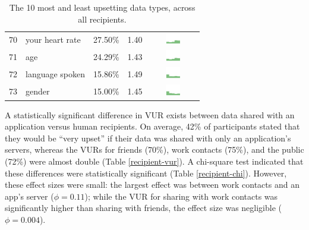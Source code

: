 \documentclass{sig-alternate-hotpets15}
\begin{document}
\begin{table}[t]
\begin{center}
\begin{tabular}{| r | l | r | r |c |}
70 & your heart rate & 27.50\% & 1.40 & \includegraphics[width = 2cm, height = 0.5cm]{tex-inputs/data10/learnedyourheartratecombined} \\
71 & age & 24.29\% & 1.43 & \includegraphics[width = 2cm, height = 0.5cm]{tex-inputs/data10/learnedyouragecombined}\\
72 & language spoken & 15.86\% & 1.49 & \includegraphics[width = 2cm, height = 0.5cm]{tex-inputs/data10/learnedthelanguageyouwerespeakingcombined}\\
73 & gender & 15.00\% & 1.45 & \includegraphics[width = 2cm, height = 0.5cm]{tex-inputs/data10/learnedyourgendercombined}\\ 
\hline
\end{tabular}
\caption{The 10 most and least upsetting data types, across all recipients.}
\label{top10-table}
\end{center}
\end{table}


A statistically significant difference in VUR exists between data shared with an application versus human recipients. On average, 42\% of participants stated that they would be ``very upset'' if their data was shared with only an application's servers, whereas the VURs for friends (70\%), work contacts (75\%), and the public (72\%) were almost double (Table \ref{recipient-vur}). A chi-square test indicated that these differences were statistically significant (Table \ref{recipient-chi}). However, these effect sizes were small: the largest effect was between work contacts and an app's server ($\phi=0.11$); while the VUR for sharing with work contacts was significantly higher than sharing with friends, the effect size was negligible ($\phi=0.004$). 
\end{document}
